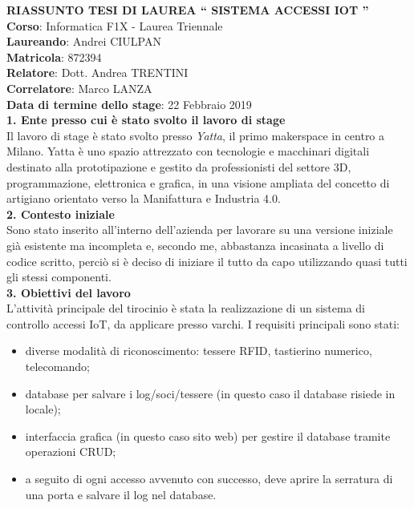 \documentclass[11pt]{report}
\begin{document}
	
	\noindent\textbf{\large RIASSUNTO TESI DI LAUREA \textquotedblleft{} SISTEMA ACCESSI IOT \textquotedblright{}} 
	\vspace*{30px} \\
	\textbf{Corso}: Informatica F1X - Laurea Triennale \\
	\textbf{Laureando}: Andrei CIULPAN \\
	\textbf{Matricola}: 872394 \\
	\textbf{Relatore}: Dott. Andrea TRENTINI \\
	\textbf{Correlatore}: Marco LANZA \\
	\textbf{Data di termine dello stage}: 22 Febbraio 2019
	\vspace*{30px} \\
	
	\noindent\textbf{\large 1. Ente presso cui è stato svolto il lavoro di stage} \\
	\newline 
	Il lavoro di stage è stato svolto presso \emph{Yatta}, il primo makerspace in centro a Milano. Yatta è uno spazio attrezzato con tecnologie e macchinari digitali destinato alla prototipazione
	e gestito da professionisti del settore 3D, programmazione, elettronica e grafica, in una
	visione ampliata del concetto di artigiano orientato verso la Manifattura e Industria
	4.0.  \\
	\newline
	\noindent\textbf{\large 2. Contesto iniziale} \\
	\newline 
	Sono stato inserito all'interno dell'azienda per lavorare su una versione iniziale già esistente ma incompleta e, secondo me, abbastanza incasinata a livello di codice scritto, perciò si è deciso di iniziare il tutto da capo utilizzando quasi tutti gli stessi componenti.  \\
	\newline
	\noindent\textbf{\large 3. Obiettivi del lavoro} \\
	\newline 
	L’attività principale del tirocinio è stata la realizzazione di un sistema di controllo accessi IoT,
	da applicare presso varchi. I requisiti principali sono stati: 
	\begin{itemize}
		\item diverse modalità di riconoscimento: tessere RFID, tastierino numerico, telecomando;
		\item database per salvare i log/soci/tessere (in questo caso il database risiede in locale);
		\item interfaccia grafica (in questo caso sito web) per gestire il database tramite operazioni CRUD;
		\item a seguito di ogni accesso avvenuto con successo, deve aprire la serratura di una porta e salvare il log nel database.
	\end{itemize} 
\end{document}
